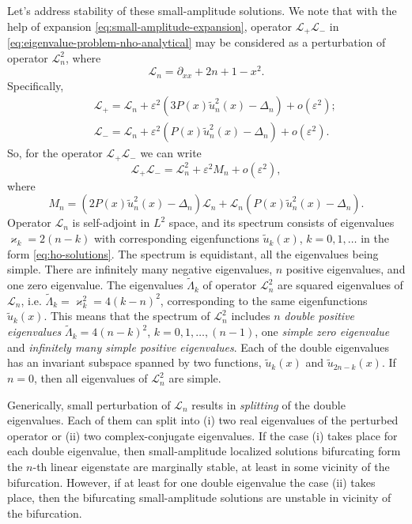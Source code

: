 Let's address stability of these small-amplitude solutions.
We note that with the help of expansion \eqref{eq:small-amplitude-expansion}, operator $\mathcal{L}_+ \mathcal{L}_-$ in \eqref{eq:eigenvalue-problem-nho-analytical} may be considered as a perturbation of operator $\mathcal{L}_n^2$, where
\begin{equation}
	\mathcal{L}_n = \partial_{xx} + 2n + 1 - x^2.
\end{equation}
Specifically,
\begin{eqnarray*}
	&& \mathcal{L}_+ = \mathcal{L}_n + \varepsilon^2 (3 P(x) \tilde{u}_n^2(x) - \Delta_n) + o(\varepsilon^2); \\
	&& \mathcal{L}_- = \mathcal{L}_n + \varepsilon^2 (P(x) \tilde{u}_n^2(x) - \Delta_n) + o(\varepsilon^2).
\end{eqnarray*}
So, for the operator $\mathcal{L}_+ \mathcal{L}_-$ we can write
\begin{equation}
	\mathcal{L}_+ \mathcal{L}_- = \mathcal{L}_n^2 + \varepsilon^2 M_n + o(\varepsilon^2),
\label{eq:perturbed-operator}
\end{equation}
where
\begin{equation}
	M_n = (2 P(x) \tilde{u}_n^2(x) - \Delta_n) \mathcal{L}_n + \mathcal{L}_n (P(x) \tilde{u}_n^2(x) - \Delta_n).
\label{eq:Mn}
\end{equation}
Operator $\mathcal{L}_n$ is self-adjoint in $L^2$ space, and its spectrum consists of eigenvalues $\varkappa_k = 2(n - k)$ with corresponding eigenfunctions $\tilde{u}_k(x)$, $k = 0, 1, \dots$  in the form \eqref{eq:ho-solutions}.
The spectrum is equidistant, all the eigenvalues being simple.
There are infinitely many negative eigenvalues, $n$ positive eigenvalues, and one zero eigenvalue.
The eigenvalues $\widetilde{\Lambda}_k$ of operator $\mathcal{L}_n^2$ are squared eigenvalues of $\mathcal{L}_n$, i.e. $\widetilde{\Lambda}_k = \varkappa_k^2 = 4 (k - n)^2$, corresponding to the same eigenfunctions $\tilde{u}_k(x)$.
This means that the spectrum of $\mathcal{L}_n^2$ includes $n$ {\it double positive eigenvalues} $\widetilde{\Lambda}_k = 4 (n - k)^2$, $k = 0, 1, \dots, (n - 1)$, one {\it simple zero eigenvalue} and {\it infinitely many simple positive eigenvalues}.
Each of the double eigenvalues has an invariant subspace spanned by two functions, $\tilde{u}_k(x)$ and $\tilde{u}_{2n - k}(x)$.
If $n = 0$, then all eigenvalues of $\mathcal{L}_n^2$ are simple.

Generically, small perturbation of $\mathcal{L}_n$ results in {\it splitting} of the double eigenvalues.
Each of them can split into (i) two real eigenvalues of the perturbed operator or (ii) two complex-conjugate eigenvalues.
If the case (i) takes place for each double eigenvalue, then small-amplitude localized solutions bifurcating form the $n$-th linear eigenstate are marginally stable, at least in some vicinity of the bifurcation.
However, if at least for one double eigenvalue the case (ii) takes place, then the bifurcating small-amplitude solutions  are unstable in vicinity of the bifurcation.

